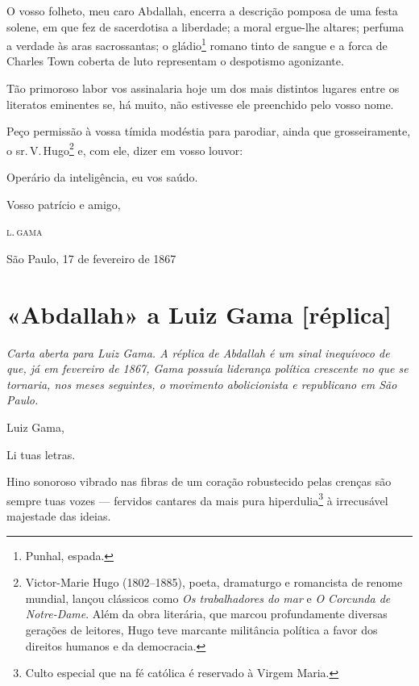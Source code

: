 O vosso folheto, meu caro Abdallah, encerra a descrição pomposa de uma
festa solene, em que fez de sacerdotisa a liberdade; a moral ergue-lhe
altares; perfuma a verdade às aras sacrossantas; o gládio\footnote{
  Punhal, espada.} romano tinto de sangue e a forca de Charles Town
coberta de luto representam o despotismo agonizante.

Tão primoroso labor vos assinalaria hoje um dos mais distintos lugares
entre os literatos eminentes se, há muito, não estivesse ele preenchido
pelo vosso nome.

Peço permissão à vossa tímida modéstia para parodiar, ainda que
grosseiramente, o sr.\,V.\,Hugo\footnote{Victor-Marie Hugo (1802--1885),
  poeta, dramaturgo e romancista de renome mundial, lançou clássicos
  como \emph{Os trabalhadores do mar} e \emph{O Corcunda de Notre-Dame}.
  Além da obra literária, que marcou profundamente diversas gerações de
  leitores, Hugo teve marcante militância política a favor dos direitos
  humanos e da democracia.\label{victor hugo}} e, com ele, dizer em vosso louvor:

Operário da inteligência, eu vos saúdo.

\begin{flushright}
Vosso patrício e amigo,

\textsc{l.\,gama}

São Paulo, 17 de fevereiro de 1867
\end{flushright}


\section{«Abdallah» a Luiz Gama {[}réplica{]}\protect\footnotemark}


\begin{didascalia}\itshape
Carta aberta para Luiz Gama. A réplica de Abdallah é um sinal
inequívoco de que, já em fevereiro de 1867, Gama possuía liderança
política crescente no que se tornaria, nos meses seguintes, o movimento
abolicionista e republicano em São Paulo.
\end{didascalia}




Luiz Gama,

Li tuas letras.

Hino sonoroso vibrado nas fibras de um coração robustecido pelas crenças
são sempre tuas vozes --- fervidos cantares da mais pura
hiperdulia\footnote{Culto especial que na fé católica é reservado à
  Virgem Maria.} à irrecusável majestade das ideias.

